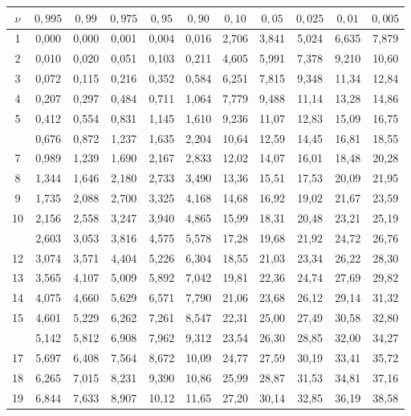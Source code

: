 \begin{tabular}{@{}c|*{10}{c}@{}}\toprule
$\nu$ & $0,995$ & $0,99$ & $0,975$ & $0,95$ & $0,90$ & $0,10$ & $0,05$ & $0,025$ & $0,01$ & $0,005$\\\midrule
1 & 0,000 & 0,000 & 0,001 & 0,004 & 0,016 & 2,706 & 3,841 & 5,024 & 6,635 & 7,879\\
2 & 0,010 & 0,020 & 0,051 & 0,103 & 0,211 & 4,605 & 5,991 & 7,378 & 9,210 & 10,60\\
3 & 0,072 & 0,115 & 0,216 & 0,352 & 0,584 & 6,251 & 7,815 & 9,348 & 11,34 & 12,84\\
4 & 0,207 & 0,297 & 0,484 & 0,711 & 1,064 & 7,779 & 9,488 & 11,14 & 13,28 & 14,86\\
5 & 0,412 & 0,554 & 0,831 & 1,145 & 1,610 & 9,236 & 11,07 & 12,83 & 15,09 & 16,75\\
\addlinespace[2pt]
6 & 0,676 & 0,872 & 1,237 & 1,635 & 2,204 & 10,64 & 12,59 & 14,45 & 16,81 & 18,55\\
7 & 0,989 & 1,239 & 1,690 & 2,167 & 2,833 & 12,02 & 14,07 & 16,01 & 18,48 & 20,28\\
8 & 1,344 & 1,646 & 2,180 & 2,733 & 3,490 & 13,36 & 15,51 & 17,53 & 20,09 & 21,95\\
9 & 1,735 & 2,088 & 2,700 & 3,325 & 4,168 & 14,68 & 16,92 & 19,02 & 21,67 & 23,59\\
10 & 2,156 & 2,558 & 3,247 & 3,940 & 4,865 & 15,99 & 18,31 & 20,48 & 23,21 & 25,19\\
\addlinespace[2pt]
11 & 2,603 & 3,053 & 3,816 & 4,575 & 5,578 & 17,28 & 19,68 & 21,92 & 24,72 & 26,76\\
12 & 3,074 & 3,571 & 4,404 & 5,226 & 6,304 & 18,55 & 21,03 & 23,34 & 26,22 & 28,30\\
13 & 3,565 & 4,107 & 5,009 & 5,892 & 7,042 & 19,81 & 22,36 & 24,74 & 27,69 & 29,82\\
14 & 4,075 & 4,660 & 5,629 & 6,571 & 7,790 & 21,06 & 23,68 & 26,12 & 29,14 & 31,32\\
15 & 4,601 & 5,229 & 6,262 & 7,261 & 8,547 & 22,31 & 25,00 & 27,49 & 30,58 & 32,80\\
\addlinespace[2pt]
16 & 5,142 & 5,812 & 6,908 & 7,962 & 9,312 & 23,54 & 26,30 & 28,85 & 32,00 & 34,27\\
17 & 5,697 & 6,408 & 7,564 & 8,672 & 10,09 & 24,77 & 27,59 & 30,19 & 33,41 & 35,72\\
18 & 6,265 & 7,015 & 8,231 & 9,390 & 10,86 & 25,99 & 28,87 & 31,53 & 34,81 & 37,16\\
19 & 6,844 & 7,633 & 8,907 & 10,12 & 11,65 & 27,20 & 30,14 & 32,85 & 36,19 & 38,58\\

\end{tabular}
